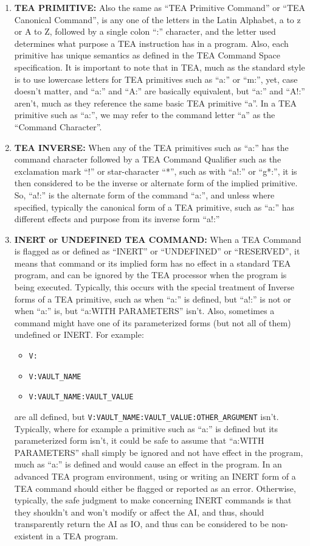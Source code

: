 \documentclass[a4paper, 18pt]{book} %
\begin{document}
\begin{enumerate}
{}
\item{
\textbf{TEA PRIMITIVE:} Also the same as “TEA Primitive Command” or “TEA Canonical Command”, is any one of the letters in the Latin Alphabet, a to z or A to Z, followed by a single colon “:” character, and the letter used determines what purpose a TEA instruction has in a program. Also, each primitive has unique semantics as defined in the TEA Command Space specification. It is important to note that in TEA, much as the standard style is to use lowercase letters for TEA primitives such as “a:” or “m:”, yet, case doesn’t matter, and “a:” and “A:” are basically equivalent, but “a:” and “A!:” aren’t, much as they reference the same basic TEA primitive “a”. In a TEA primitive such as “a:”, we may refer to the command letter “a” as the “Command Character”.
}
\item{

\textbf{TEA INVERSE:} When any of the TEA primitives such as “a:” has the command character followed by a TEA Command Qualifier such as the exclamation mark “!” or star-character “*”, such as with “a!:” or “g*:”, it is then considered to be the inverse or alternate form of the implied primitive. So, “a!:” is the alternate form of the command “a:”, and unless where specified, typically the canonical form of a TEA primitive, such as “a:” has different effects and purpose from its inverse form “a!:”
}
\item{
\textbf{INERT or UNDEFINED TEA COMMAND:} When a TEA Command is flagged as or defined as “INERT” or “UNDEFINED” or “RESERVED”, it means that command or its implied form has no effect in a standard TEA program, and can be ignored by the TEA processor when the program is being executed. Typically, this occurs with the special treatment of Inverse forms of a TEA primitive, such as when “a:” is defined, but “a!:” is not or when “a:” is, but “a:WITH PARAMETERS” isn’t. Also, sometimes a command might have one of its parameterized forms (but not all of them) undefined or INERT. For example:
\begin{itemize}
\item \texttt{V:}
\item \texttt{V:VAULT\_NAME}
\item \texttt{V:VAULT\_NAME:VAULT\_VALUE}
\end{itemize}

are all defined, but \texttt{V:VAULT\_NAME:VAULT\_VALUE:OTHER\_ARGUMENT} isn't. Typically, where for example a primitive such as “a:” is defined but its parameterized form isn’t, it could be safe to assume that “a:WITH PARAMETERS” shall simply be ignored and not have effect in the program, much as “a:” is defined and would cause an effect in the program. In an advanced TEA program environment, using or writing an INERT form of a TEA command should either be flagged or reported as an error. Otherwise, typically, the safe judgment to make concerning INERT commands is that they shouldn’t and won’t modify or affect the AI, and thus, should transparently return the AI as IO, and thus can be considered to be non-existent in a TEA program.
}
\end{enumerate}
\end{document}
